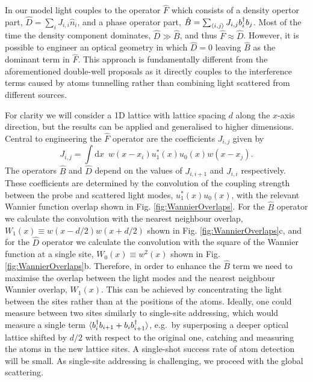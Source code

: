 In our model light couples to the operator $\hat{F}$ which consists of
a density opertor part, $\hat{D} = \sum_i J_{i,i} \hat{n}_i$, and a
phase operator part, $\hat{B} = \sum_{\langle i, j \rangle} J_{i,j}
b^\dagger_i b_j$. Most of the time the density component dominates, $\hat{D}
\gg \hat{B}$, and thus $\hat{F} \approx \hat{D}$. However, it is
possible to engineer an optical geometry in which $\hat{D} = 0$
leaving $\hat{B}$ as the dominant term in $\hat{F}$. This approach is
fundamentally different from the aforementioned double-well proposals
as it directly couples to the interference terms caused by atoms
tunnelling rather than combining light scattered from different
sources.

For clarity we will consider a 1D lattice with lattice spacing $d$
along the $x$-axis direction, but the results can be applied and
generalised to higher dimensions. Central to engineering the $\hat{F}$
operator are the coefficients $J_{i,j}$ given by
\begin{equation}
  \label{eq:Jcoeff}
  J_{i,j} = \int \mathrm{d} x \,\,\, w(x - x_i) u_1^*(x) u_0(x) w(x - x_j).
\end{equation}
The operators $\hat{B}$ and $\hat{D}$ depend on the values of
$J_{i,i+1}$ and $J_{i,i}$ respectively. These coefficients are
determined by the convolution of the coupling strength between the
probe and scattered light modes, $u_1^*(x)u_0(x)$, with the relevant
Wannier function overlap shown in Fig. \ref{fig:WannierOverlaps}. For
the $\hat{B}$ operator we calculate the convolution with the nearest
neighbour overlap, $W_1(x) \equiv w(x - d/2) w(x + d/2)$ shown in
Fig. \ref{fig:WannierOverlaps}c, and for the $\hat{D}$ operator we
calculate the convolution with the square of the Wannier function at a
single site, $W_0(x) \equiv w^2(x)$ shown in
Fig. \ref{fig:WannierOverlaps}b. Therefore, in order to enhance the
$\hat{B}$ term we need to maximise the overlap between the light modes
and the nearest neighbour Wannier overlap, $W_1(x)$. This can be
achieved by concentrating the light between the sites rather than at
the positions of the atoms. Ideally, one could measure between two
sites similarly to single-site addressing, which would measure a
single term $\langle b^\dagger_i b_{i+1}+b_i b^\dagger_{i+1}\rangle$, e.g.~by
superposing a deeper optical lattice shifted by $d/2$ with respect to
the original one, catching and measuring the atoms in the new lattice
sites. A single-shot success rate of atom detection will be small. As
single-site addressing is challenging, we proceed with the global
scattering.


